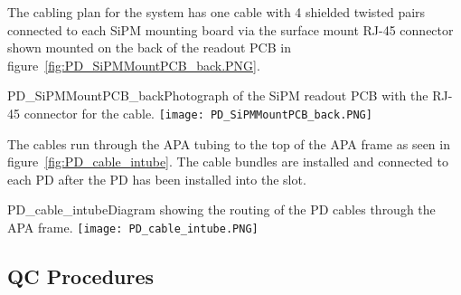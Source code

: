 
The cabling plan for the system has one cable with 4 shielded twisted pairs 
connected to each SiPM mounting board via the surface mount RJ-45 connector
shown mounted on the back of the readout PCB in 
figure~\ref{fig:PD_SiPMMountPCB_back.PNG}.  
\begin{cdrfigure}
  {PD_SiPMMountPCB_back}{Photograph of the SiPM readout PCB with the 
    RJ-45 connector for the cable.}
\texttt{[image: PD\_SiPMMountPCB\_back.PNG]}
\end{cdrfigure}
The cables run through the APA tubing to the top of the APA frame as seen
in figure~\ref{fig:PD_cable_intube}.
The cable bundles are installed and connected to each PD 
after the PD has been installed into the slot.
\begin{cdrfigure}
  {PD_cable_intube}{Diagram showing the routing of the PD cables
    through the APA frame.}
\texttt{[image: PD\_cable\_intube.PNG]}
\end{cdrfigure}


\subsection{QC Procedures}




